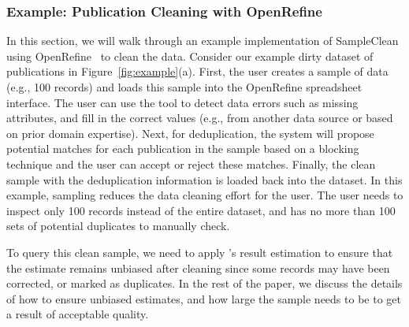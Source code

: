 \subsubsection{Example: Publication Cleaning with OpenRefine}
In this section, we will walk through an example implementation of SampleClean using OpenRefine~\cite{openrefine} to clean the data. 
Consider our example dirty dataset of publications in Figure~\ref{fig:example}(a). %
First, the user creates a sample of data (e.g., 100 records) and loads this sample into the OpenRefine spreadsheet interface.
The user can use the tool to detect data errors such as missing attributes, and fill in the correct values (e.g., from another data source or based on prior domain expertise).
Next, for deduplication, the system will propose potential matches for each publication in the sample based on a blocking technique %
and the user can accept or reject these matches.
Finally, the clean sample with the deduplication information is loaded back into the dataset. In this example, sampling reduces the data cleaning effort for the user. 
The user needs to inspect only 100 records instead of the entire dataset, and has no more than 100 sets of potential duplicates to manually check.


To query this clean sample, we need to apply \saqpplus's result estimation to ensure that the estimate remains unbiased after cleaning since some records may have been corrected, or marked as duplicates. 
In the rest of the paper, we discuss the details of how to ensure unbiased estimates, and how large the sample needs to be to get a result of acceptable quality.




